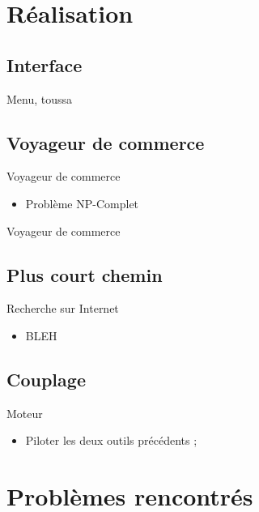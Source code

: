 \documentclass{beamer}
\begin{document}
\section{Réalisation}
    \subsection{Interface}
        \begin{frame}
            Menu, toussa
        \end{frame}
    \subsection{Voyageur de commerce}
		\begin{frame}{Voyageur de commerce}
			\begin{itemize}
				\setlength{\itemsep}{0.3cm}
				\item Problème NP-Complet
			\end{itemize}
		\end{frame}
		\begin{frame}{Voyageur de commerce}
			\begin{center}
			\end{center}
		\end{frame}
	\subsection{Plus court chemin}
		\begin{frame}{Recherche sur Internet}
			\begin{itemize}
			\setlength{\itemsep}{0.3cm}
				\item BLEH
			\end{itemize}
		\end{frame}
	\subsection{Couplage}
		\begin{frame}{Moteur}
			\begin{itemize}
				\item Piloter les deux outils précédents ;
			\end{itemize}
			\begin{center}
			\end{center}
		\end{frame}
\section{Problèmes rencontrés}
\end{document}
